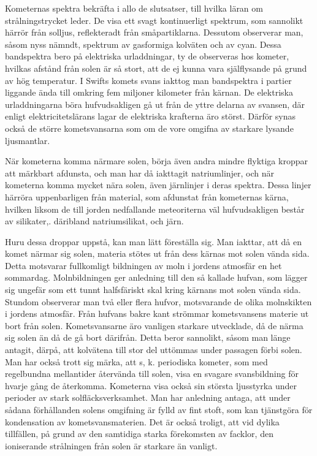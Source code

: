 \documentclass[a4paper, 12pt, oneside, swedish]{article}
\begin{document}
Kometernas spektra bekräfta i allo de slutsatser, till hvilka läran om strålningstrycket leder. De visa ett svagt kontinuerligt spektrum, som sannolikt härrör från solljus, reflekteradt från småpartiklarna. Dessutom observerar man, såsom nyss nämndt, spektrum av gasformiga kolväten och av cyan. Dessa bandspektra bero på elektriska urladdningar, ty de observeras hos kometer, hvilkas afstånd från solen är så stort, att de ej kunna vara själflysande på grund av hög temperatur. I Swifts komets svans iakttog man bandspektra i partier liggande ända till omkring fem miljoner kilometer från kärnan. De elektriska urladdningarna böra hufvudsakligen gå ut från de yttre delarna av svansen, där enligt elektricitetslärans lagar de elektriska krafterna äro störst. Därför synas också de större kometsvansarna som om de vore omgifna av starkare lysande ljusmantlar.

När kometerna komma närmare solen, börja även andra mindre flyktiga kroppar att märkbart afdunsta, och man har då iakttagit natriumlinjer, och när kometerna komma mycket nära solen, även järnlinjer i deras spektra. Dessa linjer härröra uppenbarligen från material, som afdunstat från kometernas kärna, hvilken liksom de till jorden nedfallande meteoriterna väl hufvudsakligen består av silikater,. däribland natriumsilikat, och järn.

Huru dessa droppar uppstå, kan man lätt föreställa sig. Man iakttar, att då en komet närmar sig solen, materia stötes ut från dess kärnas mot solen vända sida. Detta motsvarar fullkomligt bildningen av moln i jordens atmosfär en het sommardag. Molnbildningen ger anledning till den så kallade hufvan, som lägger sig ungefär som ett tunnt halfsfäriskt skal kring kärnans mot solen vända sida. Stundom observerar man två eller flera hufvor, motsvarande de olika molnskikten i jordens atmosfär. Från hufvans bakre kant strömmar kometsvansens materie ut bort från solen. Kometsvansarne äro vanligen starkare utvecklade, då de närma sig solen än då de gå bort därifrån. Detta beror sannolikt, såsom man länge antagit, därpå, att kolvätena till stor del uttömmas under passagen förbi solen. Man har också trott sig märka, att s, k. periodiska kometer, som med regelbundna mellantider återvända till solen, visa en svagare svansbildning för hvarje gång de återkomma. Kometerna visa också sin största ljusstyrka under perioder av stark solfläcksverksamhet. Man har anledning antaga, att under sådana förhållanden solens omgifning är fylld av fint stoft, som kan tjänstgöra för kondensation av kometsvansmaterien. Det är också troligt, att vid dylika tillfällen, på grund av den samtidiga starka förekomsten av facklor, den ioniserande strålningen från solen är starkare än vanligt.
\end{document}
